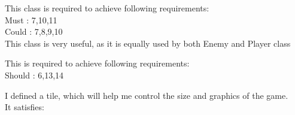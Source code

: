 \documentclass[12pt]{article}
\begin{document}
This class is required to achieve following requirements:\\
Must : 7,10,11\\
Could : 7,8,9,10\\
This class is very useful, as it is equally used by both Enemy and Player class
\begin{table}[H]
    \centering
\end{table}

This is required to achieve following requirements:\\
Should : 6,13,14\\
\begin{table}[H]
    \centering
\end{table}
\newpage
I defined a tile, which will help me control the size and graphics of the game.\\
It satisfies:
\begin{table}[H]
    \centering
\end{table}
\end{document}
